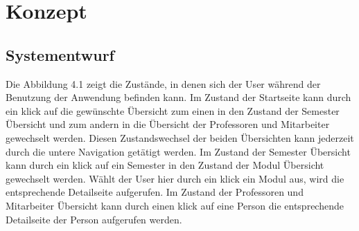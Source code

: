 \documentclass[12pt,					%
							 oneside,			%
							 a4paper,			%
							 halfparskip,		%
							 liststotoc,			%
							 bibtotoc,			%
							 fleqn,				%
							 pointlessnumbers]	%
							 {scrreprt}
\begin{document}
\chapter{Konzept}			
		
		\section{Systementwurf}
		Die Abbildung 4.1 zeigt die Zustände, in denen sich der User während der Benutzung der Anwendung befinden kann. Im Zustand der Startseite kann durch ein klick auf die gewünschte Übersicht zum einen in den Zustand der Semester Übersicht und zum andern in die Übersicht der Professoren und Mitarbeiter gewechselt werden. Diesen Zustandswechsel der beiden Übersichten kann jederzeit durch die untere Navigation getätigt werden. Im Zustand der Semester Übersicht kann durch ein klick auf ein Semester in den Zustand der Modul Übersicht gewechselt werden. Wählt der User hier durch ein klick ein Modul aus, wird die entsprechende Detailseite aufgerufen. Im Zustand der Professoren und Mitarbeiter Übersicht kann durch einen klick auf eine Person die entsprechende Detailseite der Person aufgerufen werden.
				
\end{document}
